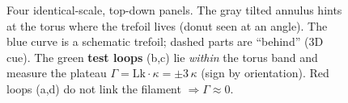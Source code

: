 {\begin{figure}[t]
{%
}

\hspace{0.9cm}
\hspace{0.9cm}
\hspace{0.9cm}

\caption{Four identical-scale, top-down panels. The gray tilted annulus hints at the torus where the trefoil lives (donut seen at an angle).
The blue curve is a schematic trefoil; dashed parts are “behind” (3D cue).
The green \textbf{test loops} (b,c) lie \emph{within} the torus band and measure the plateau \(\Gamma=\mathrm{Lk}\cdot\kappa=\pm 3\,\kappa\) (sign by orientation).
Red loops (a,d) do not link the filament \(\Rightarrow \Gamma\approx 0\).}
\label{fig:fourpanel-3D-cartoon}
\end{figure}
}

